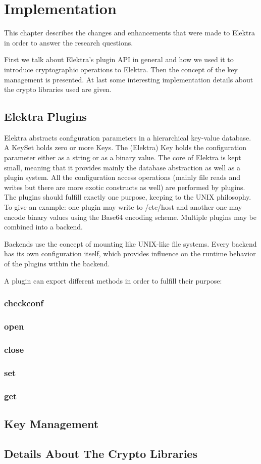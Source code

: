 \chapter{Implementation}

This chapter describes the changes and enhancements that were made to Elektra in order to answer the research questions.

First we talk about Elektra's plugin API in general and how we used it to introduce cryptographic operations to Elektra.
Then the concept of the key management is presented.
At last some interesting implementation details about the crypto libraries used are given.

\section{Elektra Plugins}

Elektra abstracts configuration parameters in a hierarchical key-value database.
A KeySet holds zero or more Keys.
The (Elektra) Key holds the configuration parameter either as a string or as a binary value.
The core of Elektra is kept small, meaning that it provides mainly the database abstraction as well as a plugin system.
All the configuration access operations (mainly file reads and writes but there are more exotic constructs as well) are performed by plugins.
The plugins should fulfill exactly one purpose, keeping to the UNIX philosophy.
To give an example: one plugin may write to /etc/host and another one may encode binary values using the Base64 encoding scheme.
Multiple plugins may be combined into a backend.

Backends use the concept of mounting like UNIX-like file systems.
Every backend has its own configuration itself, which provides influence on the runtime behavior of the plugins within the backend.

A plugin can export different methods in order to fulfill their purpose:

    \subsection{checkconf}

    \subsection{open}

    \subsection{close}

    \subsection{set}

    \subsection{get}



\section{Key Management}

\section{Details About The Crypto Libraries}
